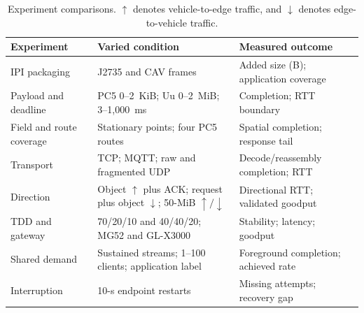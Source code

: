 \begin{table}[t]
  \caption{Experiment comparisons. $\uparrow$ denotes vehicle-to-edge traffic,
  and $\downarrow$ denotes edge-to-vehicle traffic.}
  \label{tab:core-matrix}
  \centering
  \scriptsize
  \setlength{\tabcolsep}{3pt}
  \renewcommand{\arraystretch}{1.12}
  \begin{tabular}{@{}C{0.20\textwidth}C{0.38\textwidth}C{0.34\textwidth}@{}}
    \toprule
    Experiment & Varied condition & Measured outcome \\
    \midrule
    IPI packaging & J2735 and CAV frames & Added size (B); application coverage \\
    Payload and deadline & PC5 0--2~KiB; Uu 0--2~MiB; 3--1,000~ms & Completion; RTT boundary \\
    Field and route coverage & Stationary points; four PC5 routes & Spatial completion; response tail \\
    Transport & TCP; MQTT; raw and fragmented UDP & Decode/reassembly completion; RTT \\
    Direction & Object $\uparrow$ plus ACK; request plus object $\downarrow$; 50-MiB $\uparrow/\downarrow$ & Directional RTT; validated goodput \\
    TDD and gateway & 70/20/10 and 40/40/20; MG52 and GL-X3000 & Stability; latency; goodput \\
    Shared demand & Sustained streams; 1--100 clients; application label & Foreground completion; achieved rate \\
    Interruption & 10-s endpoint restarts & Missing attempts; recovery gap \\
    \bottomrule
  \end{tabular}
\end{table}


